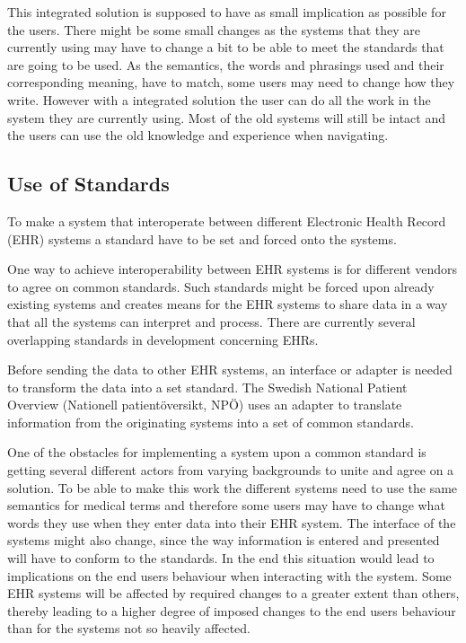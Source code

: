\documentclass[14pt]{article}
\begin{document}
This integrated solution is supposed to have as small implication as possible for the users. There might be some small changes as the systems that they are currently using may have to change a bit to be able to meet the standards that are going to be used. As the semantics, the words and phrasings used and their corresponding meaning, have to match, some users may need to change how they write. However with a integrated solution the user can do all the work in the system they are currently using. Most of the old systems will still be intact and the users can use the old knowledge and experience when navigating.

\subsection{Use of Standards} %
\label{sec:resultsStandards}
To make a system that interoperate between different Electronic Health Record (EHR) systems a standard have to be set and forced onto the systems. 

One way to achieve interoperability between \gls{EHR} systems is for different vendors to agree on common standards. Such standards might be forced upon already existing systems and creates means for the \gls{EHR} systems to share data in a way that all the systems can interpret and process. There are currently several overlapping standards in development concerning \glspl{EHR}.

Before sending the data to other \gls{EHR} systems, an interface or adapter is needed to transform the data into a set standard. The Swedish National Patient Overview (Nationell patientöversikt, NPÖ) uses an adapter to translate information from the originating systems into a set of common standards. 

One of the obstacles for implementing a system upon a common standard is getting several different actors from varying backgrounds to unite and agree on a solution. To be able to make this work the different systems need to use the same semantics for medical terms and therefore some users may have to change what words they use when they enter data into their \gls{EHR} system. The interface of the systems might also change, since the way information is entered and presented will have to conform to the standards. In the end this situation would lead to implications on the end users behaviour when interacting with the system. Some \gls{EHR} systems will be affected by required changes to a greater extent than others, thereby leading to a higher degree of imposed changes to the end users behaviour than for the systems not so heavily affected.
\end{document}
